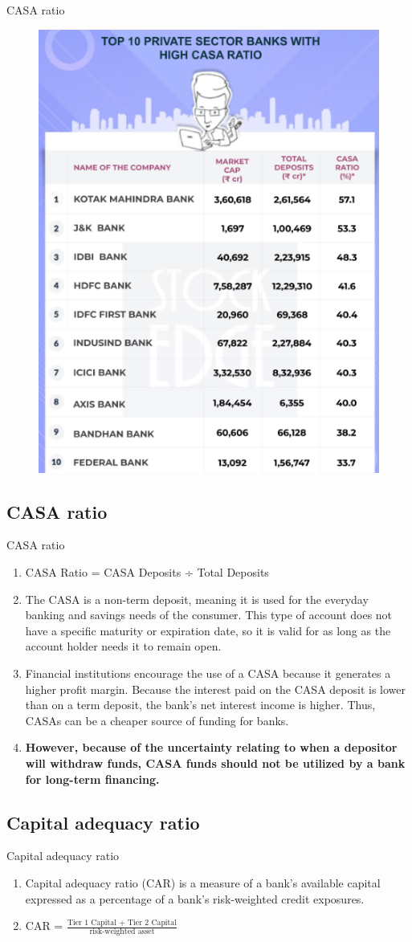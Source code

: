 \documentclass{beamer}
\begin{document}
\begin{frame}{CASA ratio}
	\begin{figure}
		\centering
		\includegraphics[width=0.47\linewidth]{CASAratio.png}
		\label{fig:casa}
	\end{figure}
\end{frame}

\subsection{CASA ratio}
\begin{frame}{CASA ratio}
	\begin{enumerate}
		\item CASA Ratio = CASA Deposits ÷ Total Deposits
		\item The CASA is a non-term deposit, meaning it is used for the everyday banking and savings needs of the consumer. This type of account does not have a specific maturity or expiration date, so it is valid for as long as the account holder needs it to remain open.
		\item Financial institutions encourage the use of a CASA because it generates a higher profit margin. Because the interest paid on the CASA deposit is lower than on a term deposit, the bank’s net interest income is higher. Thus, CASAs can be a cheaper source of funding for banks.
		\item \textbf{However, because of the uncertainty relating to when a depositor will withdraw funds, CASA funds should not be utilized by a bank for long-term financing.}
	\end{enumerate}
\end{frame}

\subsection{Capital adequacy ratio}
\begin{frame}{Capital adequacy ratio}
	\begin{enumerate}
		\item Capital adequacy ratio (CAR) is a measure of a bank's available capital expressed as a percentage of a bank's risk-weighted credit exposures.
		\item CAR = $\frac{\text{Tier 1 Capital + Tier 2 Capital}}{\text{risk-weighted asset}}$
	\end{enumerate}
\end{frame}
\end{document}
